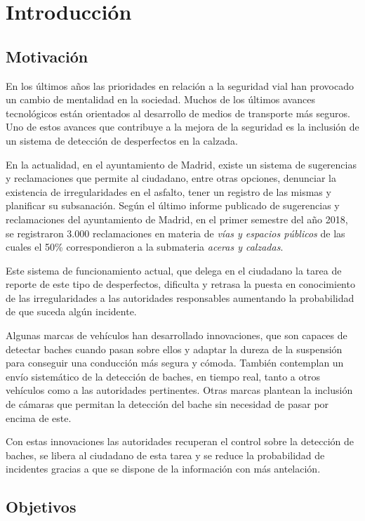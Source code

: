 \section{Introducción}

\subsection{Motivación}

En los últimos años las prioridades en relación a la seguridad vial han provocado un cambio de mentalidad en la sociedad.  Muchos de los últimos avances tecnológicos están orientados al desarrollo de medios de transporte más seguros. Uno de estos avances que contribuye a la mejora de la seguridad es la inclusión de un sistema de detección de desperfectos en la calzada.

En la actualidad, en el ayuntamiento de Madrid, existe un sistema de sugerencias y reclamaciones que permite al ciudadano, entre otras opciones, denunciar la existencia de irregularidades en el asfalto, tener un registro de las mismas y planificar su subsanación. Según el último informe publicado de sugerencias y reclamaciones del ayuntamiento de Madrid, en el primer semestre del año 2018, se registraron 3.000 reclamaciones en materia de \textit{vías y espacios públicos} de las cuales el 50\% correspondieron a la submateria \textit{aceras y calzadas}.

Este sistema de funcionamiento actual, que delega en el ciudadano la tarea de reporte de este tipo de desperfectos, dificulta y retrasa la puesta en conocimiento de las irregularidades a las autoridades responsables aumentando la probabilidad de que suceda algún incidente.

Algunas marcas de vehículos han desarrollado innovaciones, que son capaces de detectar baches cuando pasan sobre ellos y adaptar la dureza de la suspensión para conseguir una conducción más segura y cómoda. También contemplan un envío sistemático de la detección de baches, en tiempo real, tanto a otros vehículos como a las autoridades pertinentes. Otras marcas plantean la inclusión de cámaras que permitan la detección del bache sin necesidad de pasar por encima de este.

Con estas innovaciones las autoridades recuperan el control sobre la detección de baches, se libera al ciudadano de esta tarea y se reduce la probabilidad de incidentes gracias a que se dispone de la información con más antelación.

\subsection{Objetivos}

